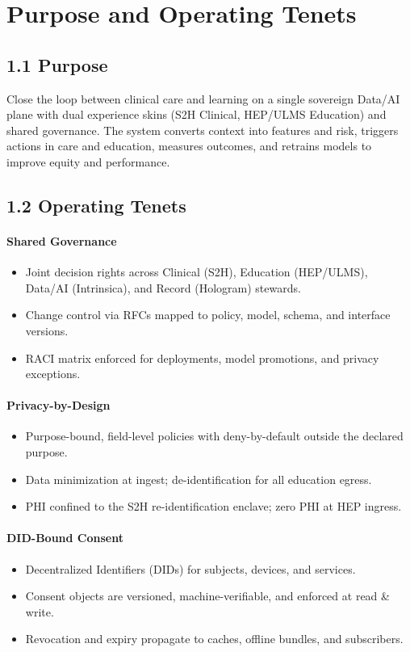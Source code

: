 \documentclass[11pt]{article}
\theoremstyle{plain}
\begin{document}
\section{Purpose and Operating Tenets}

\subsection*{1.1 Purpose}
Close the loop between clinical care and learning on a single sovereign Data/AI plane with dual experience skins (S2H Clinical, HEP/ULMS Education) and shared governance. The system converts context into features and risk, triggers actions in care and education, measures outcomes, and retrains models to improve equity and performance.

\subsection*{1.2 Operating Tenets}

\paragraph{Shared Governance}
\begin{itemize}
  \item Joint decision rights across Clinical (S2H), Education (HEP/ULMS), Data/AI (Intrinsica), and Record (Hologram) stewards.
  \item Change control via RFCs mapped to policy, model, schema, and interface versions.
  \item RACI matrix enforced for deployments, model promotions, and privacy exceptions.
\end{itemize}

\paragraph{Privacy-by-Design}
\begin{itemize}
  \item Purpose-bound, field-level policies with deny-by-default outside the declared purpose.
  \item Data minimization at ingest; de-identification for all education egress.
  \item PHI confined to the S2H re-identification enclave; zero PHI at HEP ingress.
\end{itemize}

\paragraph{DID-Bound Consent}
\begin{itemize}
  \item Decentralized Identifiers (DIDs) for subjects, devices, and services.
  \item Consent objects are versioned, machine-verifiable, and enforced at read \& write.
  \item Revocation and expiry propagate to caches, offline bundles, and subscribers.
\end{itemize}
\end{document}
